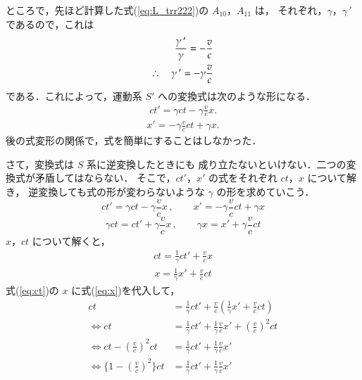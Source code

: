 ところで，先ほど計算した式(\ref{eq:L_trr222})の $A_{10}$，$A_{11}$ は，
それぞれ，$\gamma$，$\gamma\,'$ であるので，これは
\begin{align}
\frac{\gamma\,'}{\gamma} = -\frac{v}{c}\notag \\
\therefore \quad
\gamma\,' = -\gamma \frac{v}{c}
\end{align}
である．これによって，運動系 $S'$ への変換式は次のような形になる．
\begin{align}\label{eq:ctp}
ct'=\gamma ct -\gamma \frac{v}{c} x.
\end{align}
\begin{align}\label{eq:xp}
x'=-\gamma \frac{v}{c} ct+\gamma x.
\end{align}
後の式変形の関係で，式を簡単にすることはしなかった．

さて，変換式は $S$ 系に逆変換したときにも
成り立たないといけない．二つの変換式が矛盾してはならない．
そこで，$ct'$，$x'$ の式をそれぞれ $ct$，$x$ について解き，
逆変換しても式の形が変わらないような $\gamma$ の形を求めていこう．
\begin{equation*}
ct'= \gamma ct - \gamma \frac{v}{c}x\,,\qquad x' = -\gamma \frac{v}{c}ct + \gamma x
\end{equation*}
\begin{equation*}
\gamma ct = ct' + \gamma \frac{v}{c}x\,,\qquad \gamma x = x' + \gamma \frac{v}{c}ct
\end{equation*}
$x$，$ct$ について解くと，
\begin{align}\label{eq:ct}
ct=\frac{1}{\gamma}ct' + \frac{v}{c}x
\end{align}
\begin{align}\label{eq:x}
x=\frac{1}{\gamma}x'+\frac{v}{c}ct
\end{align}
式(\ref{eq:ct})の $x$ に式(\ref{eq:x})を代入して，
\begin{align*}
                     ct&=\frac{1}{\gamma}ct' + \frac{v}{c}\left(\frac{1}{\gamma}x'+\frac{v}{c}ct\right)     \\
\Leftrightarrow ct&=\frac{1}{\gamma}ct' + \frac{1}{\gamma}\frac{v}{c}x'+\left(\frac{v}{c}\right)^{2}ct \\
\Leftrightarrow ct-\left(\frac{v}{c}\right)^{2}ct&=\frac{1}{\gamma}ct' + \frac{1}{\gamma}\frac{v}{c}x' \\
\Leftrightarrow \biggl\{1-\left(\frac{v}{c}\right)^{2}\biggr\}ct&=\frac{1}{\gamma}ct' + \frac{1}{\gamma}\frac{v}{c}x'
\end{align*}

